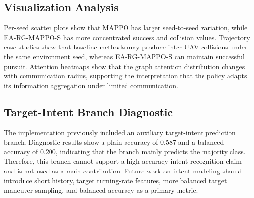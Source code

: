 \subsection{Visualization Analysis}

Per-seed scatter plots show that MAPPO has larger seed-to-seed variation, while EA-RG-MAPPO-S has more concentrated success and collision values. Trajectory case studies show that baseline methods may produce inter-UAV collisions under the same environment seed, whereas EA-RG-MAPPO-S can maintain successful pursuit. Attention heatmaps show that the graph attention distribution changes with communication radius, supporting the interpretation that the policy adapts its information aggregation under limited communication.

\subsection{Target-Intent Branch Diagnostic}

The implementation previously included an auxiliary target-intent prediction branch. Diagnostic results show a plain accuracy of 0.587 and a balanced accuracy of 0.200, indicating that the branch mainly predicts the majority class. Therefore, this branch cannot support a high-accuracy intent-recognition claim and is not used as a main contribution. Future work on intent modeling should introduce short history, target turning-rate features, more balanced target maneuver sampling, and balanced accuracy as a primary metric.
